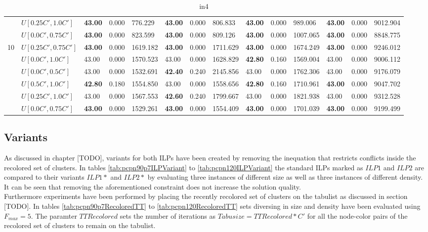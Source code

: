 \begin{table}[h]
{\begin{tabular}{|l|l||l|l|l||l|l|l||l|l|l||l|l|l|}
       & $U[0.25C',1.0C']$ & \textbf{43.00} & 0.000 & 776.229 & \textbf{43.00} & 0.000 & 806.833  & \textbf{43.00} & 0.000 & 989.006 & \textbf{43.00} & 0.000 & 9012.904\\
       & $U[0.0C',0.75C']$ & \textbf{43.00} & 0.000 & 823.599 & \textbf{43.00} & 0.000 & 809.126  & \textbf{43.00} & 0.000 & 1007.065 & \textbf{43.00} & 0.000 & 8848.775\\
      \hline\hline
      \multirow{6}{*}{10}
      & $U[0.25C',0.75C']$ & \textbf{43.00} & 0.000 & 1619.182 & \textbf{43.00} & 0.000 & 1711.629 	& \textbf{43.00} & 0.000 & 1674.249 & \textbf{43.00} & 0.000 & 9246.012\\
       & $U[0.0C',1.0C']$ & 43.00 & 0.000 & 1570.523 & 43.00 & 0.000 & 1628.829 	& \textbf{42.80} & 0.160 & 1569.004 & 43.00 & 0.000 & 9006.112\\
       & $U[0.0C',0.5C']$ & 43.00 & 0.000 & 1532.691 & \textbf{42.40} & 0.240 & 2145.856 		& 43.00 & 0.000 & 1762.306 & 43.00 & 0.000 & 9176.079\\
       & $U[0.5C',1.0C']$ & \textbf{42.80} & 0.180 & 1554.850 & 43.00 & 0.000 & 1558.656 	& \textbf{42.80} & 0.160 & 1710.961 & \textbf{43.00} & 0.000 & 9047.702\\
       & $U[0.25C',1.0C']$ & 43.00 & 0.000 & 1567.553 & \textbf{42.60} & 0.240 & 1799.667 	& 43.00 & 0.000 & 1821.938 & 43.00 & 0.000 & 9312.528\\
       & $U[0.0C',0.75C']$ & \textbf{43.00} & 0.000 & 1529.261 & \textbf{43.00} & 0.000 & 1554.409 	& \textbf{43.00} & 0.000 & 1701.039 & \textbf{43.00} & 0.000 & 9199.499\\
      \hline
      \end{tabular}
      }
      \caption{in4}
      \label{tab:in4}\end{table}


\clearpage

\subsection{Variants}
As discussed in chapter [TODO], variants for both ILPs have been created by removing the inequation that restricts conflicts inside the recolored set of clusters. In tables \ref{tab:pcpn90p7ILPVariant} to \ref{tab:pcpn120ILPVariant} the standard ILPs marked as $ILP1$ and $ILP2$ are compared to their variants $ILP1*$ and $ILP2*$ by evaluating three instances of different size as well as three instances of different density. It can be seen that removing the aforementioned constraint does not increase the solution quality.\\
Furthermore experiments have been performed by placing the recently recolored set of clusters on the tabulist as discussed in section [TODO]. In tables \ref{tab:pcpn90p7RecoloredTT} to \ref{tab:pcpn120RecoloredTT} sets diversing in size and density have been evaluated using $F_{max}=5$. The paramter $TTRecolored$ sets the number of iterations as $Tabusize=TTRecolored*C'$ for all the node-color pairs of the recolored set of clusters to remain on the tabulist.

